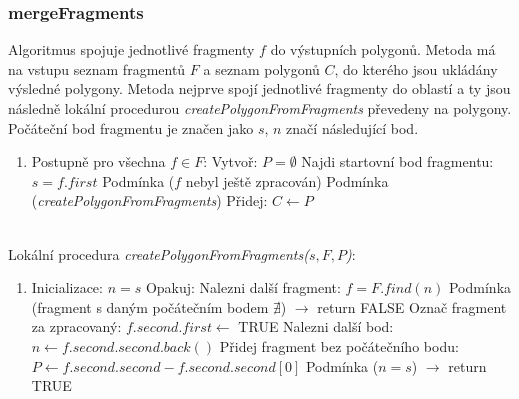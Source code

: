 \documentclass[a4paper, 12pt]{article}
\begin{document}
\subsubsection{mergeFragments}
Algoritmus spojuje jednotlivé fragmenty $f$ do výstupních polygonů. Metoda má na vstupu seznam fragmentů $F$ a seznam polygonů $C$, do kterého jsou ukládány výsledné polygony. Metoda nejprve spojí jednotlivé fragmenty do oblastí a ty jsou následně lokální procedurou \textit{createPolygonFromFragments} převedeny na polygony. Počáteční bod fragmentu je značen jako $s$, $n$ značí následující bod.

\begin{enumerate}
\item[] Postupně pro všechna $f \in F$:
\subitem Vytvoř: $P = \emptyset$
\subitem Najdi startovní bod fragmentu: $s = f.first$
\subitem Podmínka ($f$ nebyl ještě zpracován)
\subsubitem Podmínka (\textit{createPolygonFromFragments})
\subsubitem Přidej: $C \leftarrow P$
\end{enumerate}
~\\

Lokální procedura \textit{createPolygonFromFragments($s, F, P$)}:
\begin{enumerate}
\item[] Inicializace: $n = s$
\subitem Opakuj:
\subsubitem Nalezni další fragment: $f = F.find(n)$
\subsubitem Podmínka (fragment s daným počátečním bodem $\nexists$) $\rightarrow$ return FALSE
\subsubitem Označ fragment za zpracovaný: $f.second.first \leftarrow$ TRUE
\subsubitem Nalezni další bod: $n \leftarrow f.second.second.back()$
\subsubitem Přidej fragment bez počátečního bodu: $P \leftarrow f.second.second - {f.second.second[0]}$
\subsubitem Podmínka ($n = s$) $\rightarrow$ return TRUE
\end{enumerate}
\end{document}
